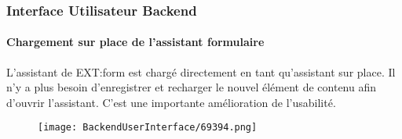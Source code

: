 \begin{frame}[fragile]
	\frametitle{Interface Utilisateur Backend}
	\framesubtitle{Chargement sur place de l'assistant formulaire}

	L'assistant de EXT:form est chargé directement en tant qu'assistant sur place.
	Il n'y a plus besoin d'enregistrer et recharger le nouvel élément de contenu
	afin d'ouvrir l'assistant. C'est une importante amélioration de l'usabilité.

	\begin{figure}
		\texttt{[image: BackendUserInterface/69394.png]}
	\end{figure}

\end{frame}

